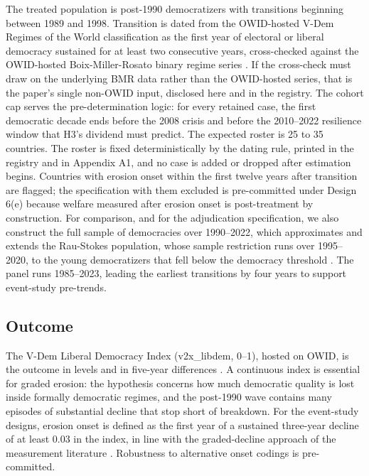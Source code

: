 The treated population is post-1990 democratizers with transitions beginning between 1989 and 1998. Transition is dated from the OWID-hosted V-Dem Regimes of the World classification as the first year of electoral or liberal democracy sustained for at least two consecutive years, cross-checked against the OWID-hosted Boix-Miller-Rosato binary regime series \citep{BoixMiller2013, LuhrmannTannenberg2018}. If the cross-check must draw on the underlying BMR data rather than the OWID-hosted series, that is the paper's single non-OWID input, disclosed here and in the registry. The cohort cap serves the pre-determination logic: for every retained case, the first democratic decade ends before the 2008 crisis and before the 2010--2022 resilience window that H3's dividend must predict. The expected roster is 25 to 35 countries. The roster is fixed deterministically by the dating rule, printed in the registry and in Appendix A1, and no case is added or dropped after estimation begins. Countries with erosion onset within the first twelve years after transition are flagged; the specification with them excluded is pre-committed under Design 6(e) because welfare measured after erosion onset is post-treatment by construction. For comparison, and for the adjudication specification, we also construct the full sample of democracies over 1990--2022, which approximates and extends the Rau-Stokes population, whose sample restriction runs over 1995--2020, to the young democratizers that fell below the democracy threshold \citep{RauStokes2025}. The panel runs 1985--2023, leading the earliest transitions by four years to support event-study pre-trends.

\subsection{Outcome}

The V-Dem Liberal Democracy Index (v2x_libdem, 0--1), hosted on OWID, is the outcome in levels and in five-year differences \citep{OurWorldInData2025, Coppedge2024}. A continuous index is essential for graded erosion: the hypothesis concerns how much democratic quality is lost inside formally democratic regimes, and the post-1990 wave contains many episodes of substantial decline that stop short of breakdown. For the event-study designs, erosion onset is defined as the first year of a sustained three-year decline of at least 0.03 in the index, in line with the graded-decline approach of the measurement literature \citep{WaldnerLust2018}. Robustness to alternative onset codings is pre-committed.

